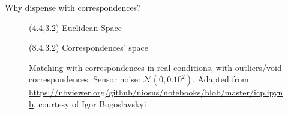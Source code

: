 \begin{frame}[noframenumbering]{Why dispense with correspondences?}

  \begin{figure}\vspace{1cm}
    \caption{Matching with correspondences in real conditions, with
             outliers/void correspondences. Sensor noise:
             $\mathcal{N}(0, 0.10^2)$. Adapted from
             \url{https://nbviewer.org/github/niosus/notebooks/blob/master/icp.ipynb},
              courtesy of Igor Bogoslavskyi}
    \begin{textblock}{3}(4.4,3.2)
      \scriptsize Euclidean Space
    \end{textblock}
    \begin{textblock}{4}(8.4,3.2)
      \scriptsize Correspondences' space
    \end{textblock}
  \end{figure}

\end{frame}
